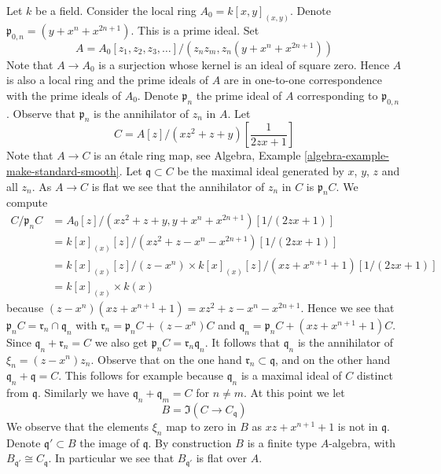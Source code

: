 \noindent
Let $k$ be a field. Consider the local ring $A_0 = k[x, y]_{(x, y)}$.
Denote $\mathfrak p_{0, n} = (y + x^n + x^{2n + 1})$. This is a prime ideal.
Set
$$
A = A_0[z_1, z_2, z_3, \ldots]/(z_n z_m, z_n(y + x^n + x^{2n + 1}))
$$
Note that $A \to A_0$ is a surjection whose kernel is an ideal of
square zero. Hence $A$ is also a local ring and the prime ideals of $A$
are in one-to-one correspondence with the prime ideals of $A_0$.
Denote $\mathfrak p_n$ the prime ideal of $A$ corresponding to
$\mathfrak p_{0, n}$. Observe that $\mathfrak p_n$ is the annihilator
of $z_n$ in $A$. Let
$$
C = A[z]/(xz^2 + z + y)[\frac{1}{2zx + 1}]
$$
Note that $A \to C$ is an \'etale ring map, see
Algebra, Example \ref{algebra-example-make-standard-smooth}.
Let $\mathfrak q \subset C$ be the maximal ideal generated by
$x$, $y$, $z$ and all $z_n$. As $A \to C$ is flat we see that the
annihilator of $z_n$ in $C$ is $\mathfrak p_nC$. We compute
\begin{align*}
C/\mathfrak p_n C
& =
A_0[z]/(xz^2 + z + y, y + x^n + x^{2n + 1})[1/(2zx + 1)] \\
& =
k[x]_{(x)}[z]/(xz^2 + z - x^n - x^{2n + 1})[1/(2zx + 1)] \\
& =
k[x]_{(x)}[z]/(z - x^n) \times
k[x]_{(x)}[z]/(xz + x^{n + 1} + 1)[1/(2zx + 1)] \\
& =
k[x]_{(x)} \times k(x)
\end{align*}
because $(z - x^n)(xz + x^{n + 1} + 1) = xz^2 + z - x^n - x^{2n + 1}$.
Hence we see that $\mathfrak p_nC = \mathfrak r_n \cap \mathfrak q_n$
with $\mathfrak r_n = \mathfrak p_nC + (z - x^n)C$ and
$\mathfrak q_n = \mathfrak p_nC + (xz + x^{n + 1} + 1)C$.
Since $\mathfrak q_n + \mathfrak r_n = C$ we also get
$\mathfrak p_nC = \mathfrak r_n \mathfrak q_n$.
It follows that $\mathfrak q_n$ is the annihilator of $\xi_n = (z - x^n)z_n$.
Observe that on the one hand $\mathfrak r_n \subset \mathfrak q$, and
on the other hand $\mathfrak q_n + \mathfrak q = C$. This follows for example
because $\mathfrak q_n$ is a maximal ideal of $C$ distinct from $\mathfrak q$.
Similarly we have $\mathfrak q_n + \mathfrak q_m = C$ for $n \not = m$.
At this point we let
$$
B = \Im(C \longrightarrow C_{\mathfrak q})
$$
We observe that the elements $\xi_n$ map to zero in $B$ as $xz + x^{n + 1} + 1$
is not in $\mathfrak q$. Denote $\mathfrak q' \subset B$ the image of
$\mathfrak q$. By construction $B$ is a finite type $A$-algebra, with
$B_{\mathfrak q'} \cong C_{\mathfrak q}$. In particular we see that
$B_{\mathfrak q'}$ is flat over $A$.

